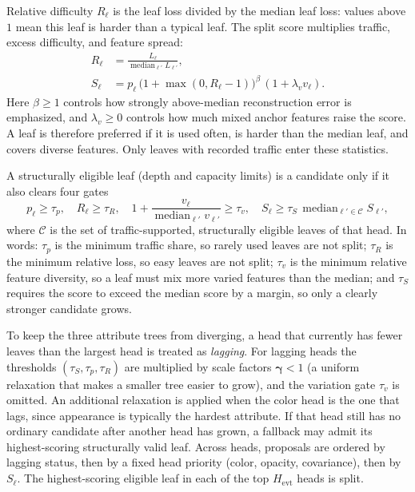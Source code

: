 Relative difficulty $R_{\ell}$ is the leaf loss divided by the median leaf loss: values above $1$ mean this leaf is harder than a typical leaf.
The split score multiplies traffic, excess difficulty, and feature spread:
\begin{equation}
\begin{aligned}
R_{\ell}
&=
\frac{L_{\ell}}{\operatorname{median}_{\ell'}L_{\ell'}},
\\
S_{\ell}
&=
p_{\ell}\,
\bigl(1+\max(0,R_{\ell}-1)\bigr)^{\beta}\,
(1+\lambda_{v}v_{\ell}).
\end{aligned}
\label{eq:growth-score}
\end{equation}
Here $\beta\ge 1$ controls how strongly above-median reconstruction error is emphasized,
and $\lambda_{v}\ge 0$ controls how much mixed anchor features raise the score.
A leaf is therefore preferred if it is used often, is harder than the median leaf, and covers diverse features.
Only leaves with recorded traffic enter these statistics.

A structurally eligible leaf (depth and capacity limits) is a candidate only if it also clears four gates
\begin{equation}
p_{\ell}\ge\tau_{p},
\quad
R_{\ell}\ge\tau_{R},
\quad
1+\frac{v_{\ell}}{\operatorname{median}_{\ell'}v_{\ell'}}\ge\tau_{v},
\quad
S_{\ell}\ge\tau_{S}\,
\operatorname{median}_{\ell'\in\mathcal{C}}S_{\ell'},
\label{eq:growth-gates}
\end{equation}
where $\mathcal{C}$ is the set of traffic-supported, structurally eligible leaves of that head.
In words:
$\tau_{p}$ is the minimum traffic share, so rarely used leaves are not split;
$\tau_{R}$ is the minimum relative loss, so easy leaves are not split;
$\tau_{v}$ is the minimum relative feature diversity, so a leaf must mix more varied features than the median;
and $\tau_{S}$ requires the score to exceed the median score by a margin, so only a clearly stronger candidate grows.

To keep the three attribute trees from diverging, a head that currently has fewer leaves than the largest head is treated as \emph{lagging}.
For lagging heads the thresholds $(\tau_{S},\tau_{p},\tau_{R})$ are multiplied by scale factors $\boldsymbol{\gamma}<1$ (a uniform relaxation that makes a smaller tree easier to grow), and the variation gate $\tau_{v}$ is omitted.
An additional relaxation is applied when the color head is the one that lags, since appearance is typically the hardest attribute.
If that head still has no ordinary candidate after another head has grown, a fallback may admit its highest-scoring structurally valid leaf.
Across heads, proposals are ordered by lagging status, then by a fixed head priority (color, opacity, covariance), then by $S_{\ell}$.
The highest-scoring eligible leaf in each of the top $H_{\mathrm{evt}}$ heads is split.

